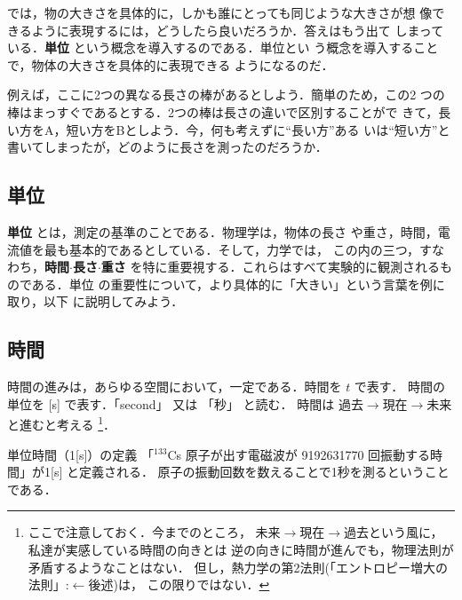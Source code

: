             では，物の大きさを具体的に，しかも誰にとっても同じような大きさが想
            像できるように表現するには，どうしたら良いだろうか．答えはもう出て
            しまっている．\textbf{単位} という概念を導入するのである．単位とい
            う概念を導入することで，物体の大きさを具体的に表現できる
            ようになるのだ．

            例えば，ここに2つの異なる長さの棒があるとしよう．簡単のため，この2
            つの棒はまっすぐであるとする．2つの棒は長さの違いで区別することがで
            きて，長い方をA，短い方をBとしよう．今，何も考えずに“長い方”ある
            いは“短い方”と書いてしまったが，どのように長さを測ったのだろうか．

        \subsection{単位}
            \textbf{単位} とは，測定の基準のことである．物理学は，物体の長さ
            や重さ，時間，電流値を最も基本的であるとしている．そして，力学では，
            この内の三つ，すなわち，\textbf{時間}$\cdot$\textbf{長さ}$\cdot$\textbf{重さ}
            を特に重要視する．これらはすべて実験的に観測されるものである．単位
            の重要性について，より具体的に「大きい」という言葉を例に取り，以下
            に説明してみよう．


        \subsection{時間}
            時間の進みは，あらゆる空間において，一定である．時間を $t$ で表す．
            時間の単位を [s] で表す．「second」 又は 「秒」 と読む．
            時間は 過去$\rightarrow$現在$\rightarrow$未来 と進むと考える
                \footnote{
                    ここで注意しておく．今までのところ，
                    未来$\rightarrow$現在$\rightarrow$過去という風に，
                    私達が実感している時間の向きとは
                    逆の向きに時間が進んでも，物理法則が矛盾するようなことはない．
                    但し，熱力学の第2法則(「エントロピー増大の法則」:$\leftarrow$後述)は，
                    この限りではない．
                }．
            \begin{myshadebox}{単位時間（1[s]）の定義}
                「${}^{133}${\rm Cs} 原子が出す電磁波が 9192631770 回振動する時間」が1[s] と定義される．
                原子の振動回数を数えることで1秒を測るということである．
            \end{myshadebox}

